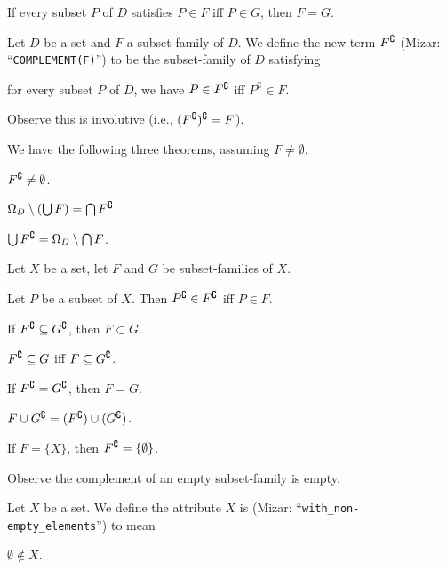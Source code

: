 \documentclass{article}
\begin{document}
\begin{thm}
\item\label{setfam1:31} If every subset $P$ of $D$ satisfies $P\in F$
  iff $P\in G$, then $F=G$.
\end{thm}

\begin{definition}
Let $D$ be a set and $F$ a subset-family of $D$.
We define the new term $F^{\complement}$ (Mizar: ``\verb#COMPLEMENT(F)#'') to be the subset-family of $D$ satisfying
\begin{defn}
\item for every subset $P$ of $D$, we have $P\in F^{\complement}$ iff
  $P^{\complement}\in F$.
\end{defn}
Observe this is involutive (i.e., $(F^{\complement})^{\complement}=F$).
\end{definition}

We have the following three theorems, assuming $F\neq\emptyset$.
\begin{thm}
\item\label{setfam1:32} $F^{\complement}\neq\emptyset$.
\item\label{setfam1:33} $\Omega_{D}\setminus(\bigcup F)=\bigcap F^{\complement}$.
\item\label{setfam1:34} $\bigcup F^{\complement}=\Omega_{D}\setminus\bigcap F$.
\end{thm}

Let $X$ be a set, let $F$ and $G$ be subset-families of $X$.
\begin{thm}
\item\label{setfam1:35} Let $P$ be a subset of $X$. Then
  $P^{\complement}\in F^{\complement}$ iff $P\in F$.
\item\label{setfam1:36} If $F^{\complement}\subseteq G^{\complement}$, then
  $F\subset G$.
\item\label{setfam1:37} $F^{\complement}\subseteq G$ iff $F\subseteq G^{\complement}$.
\item\label{setfam1:38} If $F^{\complement}=G^{\complement}$, then $F=G$.
\item\label{setfam1:39} $F\cup G^{\complement}=(F^{\complement})\cup(G^{\complement})$.
\item\label{setfam1:40} If $F=\{X\}$, then $F^{\complement}=\{\emptyset\}$.
\end{thm}

Observe the complement of an empty subset-family is empty.

\begin{definition}
Let $X$ be a set. We define the attribute $X$ is 
(Mizar: ``\verb#with_non-empty_elements#'')
to mean
\begin{defn}
\item $\emptyset\notin X$.
\end{defn}
\end{definition}
\end{document}

